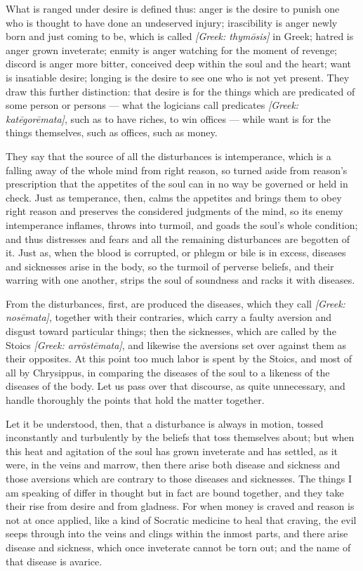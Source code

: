  What is ranged under desire is defined thus: anger is the desire to punish one who is thought to have done an undeserved injury; irascibility is anger newly born and just coming to be, which is called \textit{[Greek: thymōsis]} in Greek; hatred is anger grown inveterate; enmity is anger watching for the moment of revenge; discord is anger more bitter, conceived deep within the soul and the heart; want is insatiable desire; longing is the desire to see one who is not yet present. They draw this further distinction: that desire is for the things which are predicated of some person or persons — what the logicians call predicates \textit{[Greek: katēgorēmata]}, such as to have riches, to win offices — while want is for the things themselves, such as offices, such as money.

 They say that the source of all the disturbances is intemperance, which is a falling away of the whole mind from right reason, so turned aside from reason's prescription that the appetites of the soul can in no way be governed or held in check. Just as temperance, then, calms the appetites and brings them to obey right reason and preserves the considered judgments of the mind, so its enemy intemperance inflames, throws into turmoil, and goads the soul's whole condition; and thus distresses and fears and all the remaining disturbances are begotten of it. Just as, when the blood is corrupted, or phlegm or bile is in excess, diseases and sicknesses arise in the body, so the turmoil of perverse beliefs, and their warring with one another, strips the soul of soundness and racks it with diseases.

 From the disturbances, first, are produced the diseases, which they call \textit{[Greek: nosēmata]}, together with their contraries, which carry a faulty aversion and disgust toward particular things; then the sicknesses, which are called by the Stoics \textit{[Greek: arrōstēmata]}, and likewise the aversions set over against them as their opposites. At this point too much labor is spent by the Stoics, and most of all by Chrysippus, in comparing the diseases of the soul to a likeness of the diseases of the body. Let us pass over that discourse, as quite unnecessary, and handle thoroughly the points that hold the matter together.

 Let it be understood, then, that a disturbance is always in motion, tossed inconstantly and turbulently by the beliefs that toss themselves about; but when this heat and agitation of the soul has grown inveterate and has settled, as it were, in the veins and marrow, then there arise both disease and sickness and those aversions which are contrary to those diseases and sicknesses. The things I am speaking of differ in thought but in fact are bound together, and they take their rise from desire and from gladness. For when money is craved and reason is not at once applied, like a kind of Socratic medicine to heal that craving, the evil seeps through into the veins and clings within the inmost parts, and there arise disease and sickness, which once inveterate cannot be torn out; and the name of that disease is avarice.


